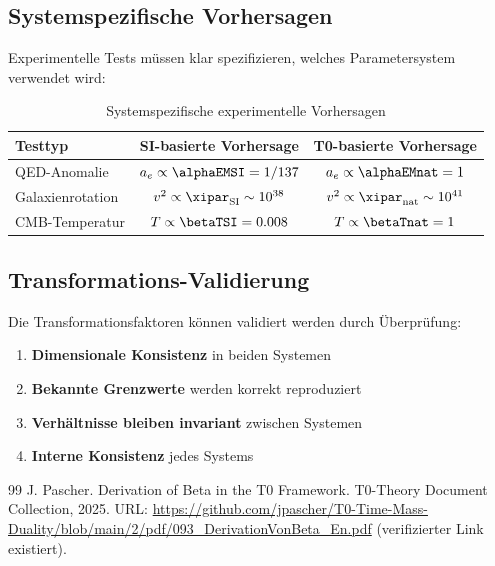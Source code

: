 	\subsection{Systemspezifische Vorhersagen}
	\label{subsec:systemspezifische_vorhersagen}
	
	Experimentelle Tests müssen klar spezifizieren, welches Parametersystem verwendet wird:
	
	\begin{table}[htbp]
		\centering
		\begin{tabular}{lcc}
			\toprule
			\textbf{Testtyp} & \textbf{SI-basierte Vorhersage} & \textbf{T0-basierte Vorhersage} \\
			\midrule
			QED-Anomalie & $a_e \propto \alphaEMSI = 1/137$ & $a_e \propto \alphaEMnat = 1$ \\
			Galaxienrotation & $v^2 \propto \xipar_{\text{SI}} \sim 10^{38}$ & $v^2 \propto \xipar_{\text{nat}} \sim 10^{41}$ \\
			CMB-Temperatur & $T \propto \betaTSI = 0.008$ & $T \propto \betaTnat = 1$ \\
			\bottomrule
		\end{tabular}
		\caption{Systemspezifische experimentelle Vorhersagen}
		\label{tab:system_vorhersagen}
	\end{table}
	
	\subsection{Transformations-Validierung}
	\label{subsec:transformations_validierung}
	
	Die Transformationsfaktoren können validiert werden durch Überprüfung:
	
	\begin{enumerate}
		\item \textbf{Dimensionale Konsistenz} in beiden Systemen
		\item \textbf{Bekannte Grenzwerte} werden korrekt reproduziert
		\item \textbf{Verhältnisse bleiben invariant} zwischen Systemen
		\item \textbf{Interne Konsistenz} jedes Systems
	\end{enumerate}
	
	\begin{thebibliography}{99}
J. Pascher.
\newblock Derivation of Beta in the T0 Framework.
\newblock T0-Theory Document Collection, 2025.
\newblock URL: \url{https://github.com/jpascher/T0-Time-Mass-Duality/blob/main/2/pdf/093_DerivationVonBeta_En.pdf}
(verifizierter Link existiert).
\end{thebibliography}